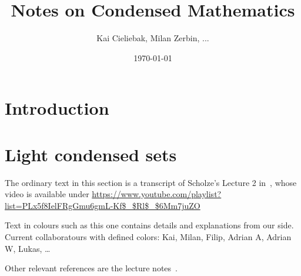 \documentclass{notes}
\begin{document}
\title{Notes on Condensed Mathematics} 
\author{Kai Cieliebak, Milan Zerbin, ...}
\date{\today}



\maketitle


\section{Introduction}\label{sec:intro}

\section{Light condensed sets}\label{sec:light-condensed-sets}

The ordinary text in this section is a transcript of Scholze's Lecture
2 in~\cite{videos}, whose video is available under
\url{https://www.youtube.com/playlist?list=PLx5f8IelFRgGmu6gmL-Kf$\_$Rl$\_$6Mm7juZO}

Text in colours such as {\kai this one} contains details and
explanations from our side.
Current collaboratours with defined colors:
{\kai Kai}, %
{\milan Milan}, %
{\filip Filip}, %
{\sadrian Adrian A}, %
{\adrian Adrian W}, %
{\lukas Lukas},
\dots

Other relevant references are the lecture
notes~\cite{analytic,condensed,complex}. 

\end{document}
